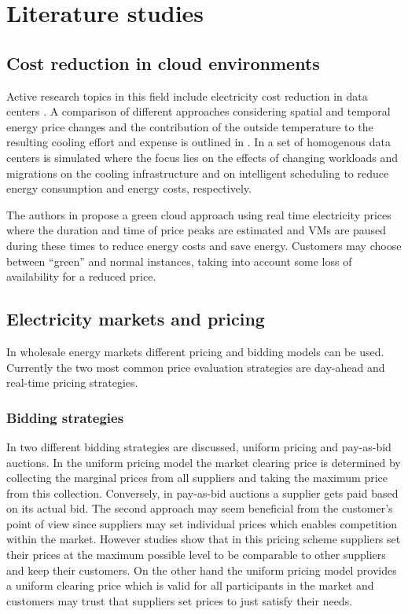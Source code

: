 

\section{Literature studies}

\subsection{Cost reduction in cloud environments}

Active research topics in this field include electricity cost reduction in data centers \cite{guler2013cutting, le2011reducing}. A comparison of different approaches considering spatial and temporal energy price changes and the contribution of the outside temperature to the resulting cooling effort and expense is outlined in \cite{guler2013cutting}. In \cite{le2011reducing} a set of homogenous data centers is simulated where the focus lies on the effects of changing workloads and migrations on the cooling infrastructure and on intelligent scheduling to reduce energy consumption and energy costs, respectively. 

The authors in \cite{lucanin2013take} propose a green cloud approach using real time electricity prices where the duration and time of price peaks are estimated and VMs are paused during these times to reduce energy costs and save energy. Customers may choose between ``green'' and normal instances, taking into account some loss of availability for a reduced price. 

\subsection{Electricity markets and pricing}

In wholesale energy markets different pricing and bidding models can be used. Currently the two most common price evaluation strategies are day-ahead and real-time pricing strategies. 

\subsubsection{Bidding strategies}

In \cite{tierney2008uniform} two different bidding strategies are discussed, uniform pricing and pay-as-bid auctions. In the uniform pricing model the market clearing price is determined by collecting the marginal prices from all suppliers and taking the maximum price from this collection. Conversely, in pay-as-bid auctions a supplier gets paid based on its actual bid. 
The second approach may seem beneficial from the customer's point of view since suppliers may set individual prices which enables competition within the market. 
However studies show that in this pricing scheme suppliers set their prices at the maximum possible level to be comparable to other suppliers and keep their customers. On the other hand the uniform pricing model provides a uniform clearing price which is valid for all participants in the market and customers may trust that suppliers set prices to just satisfy their needs. 

